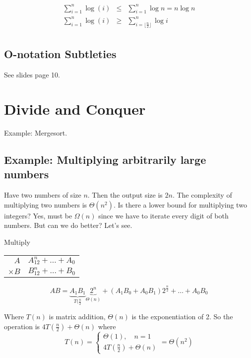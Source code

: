 \documentclass[12pt]{article}
\begin{document}
\begin{eqnarray}
    \sum_{i=1}^{n}\log(i) &\leq& \sum_{i=1}^{n}\log n = n \log n\\
    \sum_{i=1}^{n}\log(i) &\geq& \sum_{i=\lfloor\frac{n}{2}\rfloor}^n \log i\\
\end{eqnarray}

\subsection{O-notation Subtleties}

See slides page 10.

\section{Divide and Conquer}

Example: Mergesort.

\subsection{Example: Multiplying arbitrarily large numbers}

Have two numbers of size $n$. Then the output size is $2n$. The complexity of
multiplying two numbers is $\Theta(n^2)$. Is there a lower bound for multiplying
two integers? Yes, must be $\Omega(n)$ since we have to iterate every digit of
both numbers. But can we do better? Let's see.

Multiply
\begin{tabular}{r|l}
    $A$ & $A_12^{n} + \dots + A_0$\\
    $\times B$ & $B_12^{n} + \dots + B_0$\\
    \hline
\end{tabular}


\begin{equation}
    AB = \underbrace{A_1B_1}_{T(\frac{n}{2}}\underbrace{2^n}_{\Theta(n)} + (A_1B_0 + A_0B_1)2^{\frac{n}{2}} + \dots + A_0B_0
\end{equation}

Where $T(n)$ is matrix addition, $\Theta(n)$ is the exponentiation of 2. So the
operation is $4T\left(\frac{n}{2}\right) + \Theta(n)$ where
\begin{equation}
    T(n) = \begin{cases}
        \Theta(1),\quad n=1\\
        4T\left( \frac{n}{2} \right) + \Theta(n)
    \end{cases} = \Theta(n^2)
\end{equation}
\end{document}
